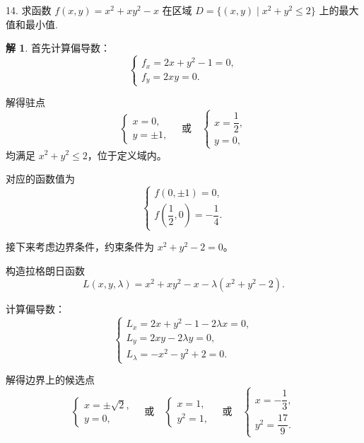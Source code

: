 \documentclass[a4paper,12pt]{article}
\theoremstyle{definition}
\newtheorem*{sol}{解}
\begin{document}
14. 求函数 $f(x,y) = x^2 + xy^2 - x$ 在区域 $D = \{(x,y) \mid x^2 + y^2 \leq 2\}$ 上的最大值和最小值.
\begin{sol}
    首先计算偏导数：
    $$
        \begin{cases}
            \displaystyle f_x=2x+y^2-1=0, \\[8pt]
            \displaystyle f_y=2xy=0.
        \end{cases}
    $$

    解得驻点
    $$
        \begin{cases}
            x=0, \\
            y=\pm1,
        \end{cases}
        \quad\text{或}\quad
        \begin{cases}
            x=\dfrac{1}{2}, \\
            y=0,
        \end{cases}
    $$
    均满足 $x^2 + y^2 \leq 2$，位于定义域内。

    对应的函数值为
    $$
        \begin{cases}
            f(0,\pm1)=0, \\[8pt]
            f\left(\dfrac{1}{2},0\right)=-\dfrac{1}{4}.
        \end{cases}
    $$

    接下来考虑边界条件，约束条件为 $x^2 + y^2 -2=0$。

    构造拉格朗日函数
    $$
        L(x,y,\lambda)=x^2 + xy^2 - x - \lambda(x^2 + y^2 - 2).
    $$

    计算偏导数：
    $$
        \begin{cases}
            \displaystyle L_x=2x+y^2-1-2\lambda x=0, \\[8pt]
            \displaystyle L_y=2xy-2\lambda y=0,      \\[8pt]
            \displaystyle L_\lambda=-x^2-y^2+2=0.
        \end{cases}
    $$

    解得边界上的候选点
    $$
        \begin{cases}
            x=\pm\sqrt{2}, \\
            y=0,
        \end{cases}
        \quad\text{或}\quad
        \begin{cases}
            x=1, \\
            y^2=1,
        \end{cases}
        \quad\text{或}\quad
        \begin{cases}
            x=-\dfrac{1}{3}, \\
            y^2=\dfrac{17}{9}.
        \end{cases}
    $$


\end{sol}
\end{document}
